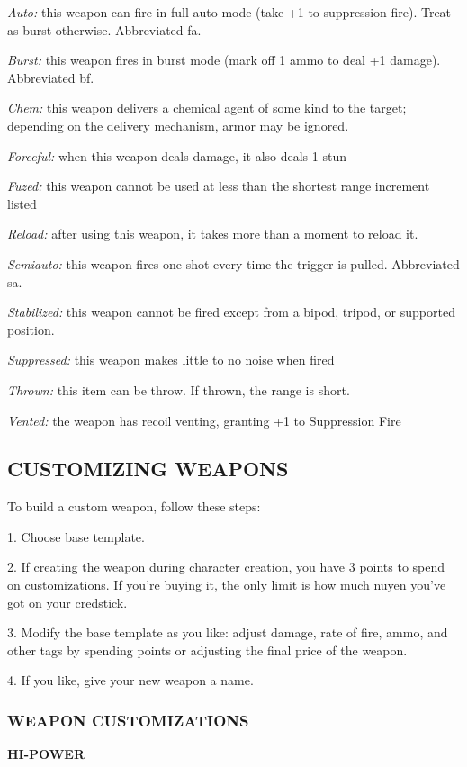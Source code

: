 \documentclass[oneside,10pt]{article}
\begin{document}
\begin{multicols}{2}
\begin{dent}
\textit{Auto:} this weapon can fire in full auto mode (take +1 to
suppression fire). Treat as burst otherwise. Abbreviated fa.

\textit{Burst:} this weapon fires in burst mode (mark off 1 ammo to
deal +1 damage). Abbreviated bf.

\textit{Chem:} this weapon delivers a chemical agent of some kind
to the target; depending on the delivery mechanism, armor may be ignored.

\textit{Forceful:} when this weapon deals damage, it also deals 1
stun

\textit{Fuzed:} this weapon cannot be used at less than the shortest range increment listed

\textit{Reload:} after using this weapon, it takes more than a moment to reload it.

\textit{Semiauto:} this weapon fires one shot every time the trigger is pulled. Abbreviated sa.

\textit{Stabilized:} this weapon cannot be fired except from a bipod, tripod, or supported position.

\textit{Suppressed:} this weapon makes little to no noise when
fired

\textit{Thrown:} this item can be throw. If thrown, the range is
short.

\textit{Vented:} the weapon has recoil venting, granting +1 to
Suppression Fire
\end{dent}

\subsection{CUSTOMIZING WEAPONS}
To build a custom weapon, follow these steps:

\begin{dent}
1.	Choose base template.

2.	If creating the weapon during character creation, you
have 3 points to spend on customizations. If you’re buying it, the only limit is how much nuyen you’ve got on
your credstick.

3.	Modify the base template as you like: adjust damage,
rate of fire, ammo, and other tags by spending points or
adjusting the final price of the weapon.

4.	If you like, give your new weapon a name.
\end{dent}

\subsubsection{WEAPON CUSTOMIZATIONS}
\textbf{HI-POWER}


\end{multicols}
\end{document}
